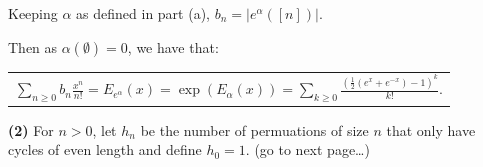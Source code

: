 \documentclass{book}
\newcommand{\exOne}{%
   \color{Purple}%
   \fontsize{13}{15}\selectfont%
}
\newenvironment{myIndent}{%
   \begin{adjustwidth}{2.5em}{0em}%
}{%
   \end{adjustwidth}%
}
\newcommand{\blab}[1]{\textbf{#1}}
\newcommand{\retTwo}{\hfill\bigbreak}
\begin{document}
\begin{enumerate}
	\begin{myIndent}\exOne
		Keeping $\alpha$ as defined in part (a), $b_{n} = |e^{\alpha}([n])|$.\retTwo

		Then as $\alpha(\emptyset) = 0$, we have that:

		{\centering\begin{tabular}{l}
			$\sum\limits_{n \geq 0}b_{n}\frac{x^n}{n!} = E_{e^\alpha}(x) = \exp(E_\alpha(x)) = \sum\limits_{k\geq 0} \frac{(\frac{1}{2}(e^x + e^{-x}) - 1)^k}{k!}$.
		\end{tabular}\retTwo\par}
		\retTwo
	\end{myIndent}
\end{enumerate}

\blab{(2)} For $n > 0$, let $h_n$ be the number of permuations of size $n$ that only have cycles of even length and define $h_0 = 1$. (go to next page\dots)\newpage
\end{document}
